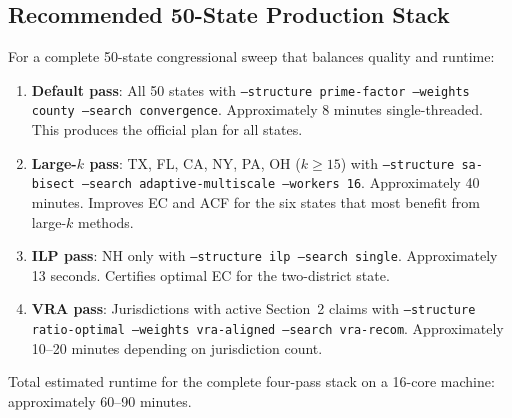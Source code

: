 \subsection{Recommended 50-State Production Stack}

For a complete 50-state congressional sweep that balances quality and runtime:

\begin{enumerate}
  \item \textbf{Default pass}: All 50 states with
        \texttt{--structure prime-factor --weights county --search convergence}.
        Approximately 8 minutes single-threaded.
        This produces the official plan for all states.

  \item \textbf{Large-$k$ pass}: TX, FL, CA, NY, PA, OH ($k \geq 15$) with
        \texttt{--structure sa-bisect --search adaptive-multiscale --workers 16}.
        Approximately 40 minutes.
        Improves EC and ACF for the six states that most benefit from
        large-$k$ methods.

  \item \textbf{ILP pass}: NH only with
        \texttt{--structure ilp --search single}.
        Approximately 13 seconds.
        Certifies optimal EC for the two-district state.

  \item \textbf{VRA pass}: Jurisdictions with active Section~2 claims with
        \texttt{--structure ratio-optimal --weights vra-aligned --search vra-recom}.
        Approximately 10--20 minutes depending on jurisdiction count.
\end{enumerate}

Total estimated runtime for the complete four-pass stack on a 16-core machine:
approximately 60--90 minutes.
